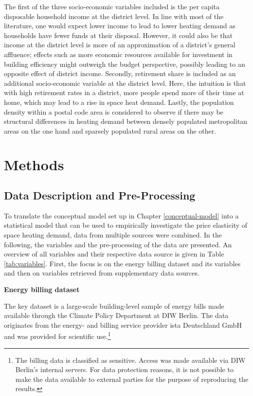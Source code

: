 \documentclass[12pt,twoside]{reedthesis}
\begin{document}
The first of the three socio-economic variables included is the per capita disposable household income at the district level. In line with most of the literature, one would expect lower income to lead to lower heating demand as households have fewer funds at their disposal. However, it could also be that income at the district level is more of an approximation of a district's general affluence; effects such as more economic resources available for investment in building efficiency might outweigh the budget perspective, possibly leading to an opposite effect of district income. Secondly, retirement share is included as an additional socio-economic variable at the district level. Here, the intuition is that with high retirement rates in a district, more people spend more of their time at home, which may lead to a rise in space heat demand. Lastly, the population density within a postal code area is considered to observe if there may be structural differences in heating demand between densely populated metropolitan areas on the one hand and sparsely populated rural areas on the other.

\hypertarget{methods}{%
\chapter{Methods}\label{methods}}

\hypertarget{data}{%
\section{Data Description and Pre-Processing}\label{data}}

To translate the conceptual model set up in Chapter \ref{conceptual-model} into a statistical model that can be used to empirically investigate the price elasticity of space heating demand, data from multiple sources were combined. In the following, the variables and the pre-processing of the data are presented. An overview of all variables and their respective data source is given in Table \ref{tab:variables}. First, the focus is on the energy billing dataset and its variables and then on variables retrieved from supplementary data sources.

\textbf{Energy billing dataset}

The key dataset is a large-scale building-level sample of energy bills made available through the Climate Policy Department at DIW Berlin. The data originates from the energy- and billing service provider ista Deutschland GmbH and was provided for scientific use.\footnote{The billing data is classified as sensitive. Access was made available via DIW Berlin's internal servers. For data protection reasons, it is not possible to make the data available to external parties for the purpose of reproducing the results.}
\end{document}
